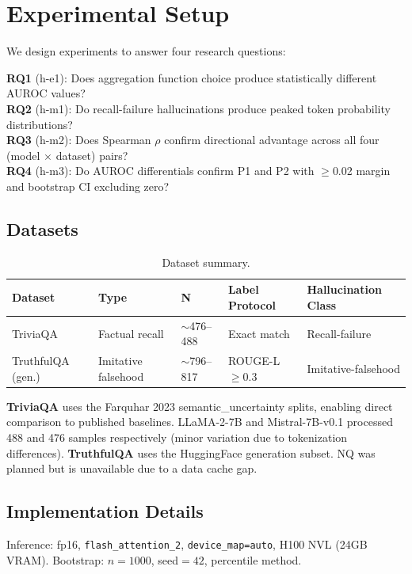 \section{Experimental Setup}

We design experiments to answer four research questions:

\textbf{RQ1} (h-e1): Does aggregation function choice produce statistically different AUROC values?\\
\textbf{RQ2} (h-m1): Do recall-failure hallucinations produce peaked token probability distributions?\\
\textbf{RQ3} (h-m2): Does Spearman $\rho$ confirm directional advantage across all four (model $\times$ dataset) pairs?\\
\textbf{RQ4} (h-m3): Do AUROC differentials confirm P1 and P2 with $\geq$0.02 margin and bootstrap CI excluding zero?

\subsection*{Datasets}

\begin{table}[h]
\centering
\caption{Dataset summary.}
\label{tab:datasets}
\begin{tabular}{lllll}
\toprule
Dataset & Type & N & Label Protocol & Hallucination Class \\
\midrule
TriviaQA & Factual recall & $\sim$476--488 & Exact match \citep{farquhar2024} & Recall-failure \\
TruthfulQA (gen.) & Imitative falsehood & $\sim$796--817 & ROUGE-L $\geq 0.3$ \citep{fadeeva2024} & Imitative-falsehood \\
\bottomrule
\end{tabular}
\end{table}

\textbf{TriviaQA} \citep{joshi2017} uses the Farquhar 2023 semantic\_uncertainty splits, enabling direct comparison to published baselines. LLaMA-2-7B and Mistral-7B-v0.1 processed 488 and 476 samples respectively (minor variation due to tokenization differences). \textbf{TruthfulQA} \citep{lin2022} uses the HuggingFace generation subset. NQ was planned but is unavailable due to a data cache gap.

\subsection*{Implementation Details}

Inference: fp16, \texttt{flash\_attention\_2}, \texttt{device\_map=auto}, H100 NVL (24GB VRAM). Bootstrap: $n{=}1000$, seed$=42$, percentile method.

